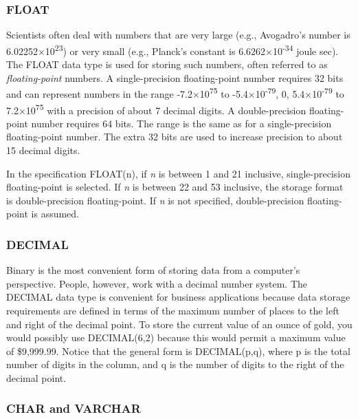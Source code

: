 \documentclass[
]{article}
\begin{document}
\hypertarget{float}{%
\subsubsection*{FLOAT}\label{float}}

Scientists often deal with numbers that are very large (e.g., Avogadro's
number is 6.02252×10\textsuperscript{23}) or very small (e.g., Planck's
constant is 6.6262×10\textsuperscript{-34} joule sec). The FLOAT data
type is used for storing such numbers, often referred to as
\emph{floating-point} numbers. A single-precision floating-point number
requires 32 bits and can represent numbers in the range
-7.2×10\textsuperscript{75} to -5.4×10\textsuperscript{-79}, 0,
5.4×10\textsuperscript{-79} to 7.2×10\textsuperscript{75} with a
precision of about 7 decimal digits. A double-precision floating-point
number requires 64 bits. The range is the same as for a single-precision
floating-point number. The extra 32 bits are used to increase precision
to about 15 decimal digits.

In the specification FLOAT(n), if \emph{n} is between 1 and 21
inclusive, single-precision floating-point is selected. If \emph{n} is
between 22 and 53 inclusive, the storage format is double-precision
floating-point. If \emph{n} is not specified, double-precision
floating-point is assumed.

\hypertarget{decimal}{%
\subsubsection*{DECIMAL}\label{decimal}}

Binary is the most convenient form of storing data from a computer's
perspective. People, however, work with a decimal number system. The
DECIMAL data type is convenient for business applications because data
storage requirements are defined in terms of the maximum number of
places to the left and right of the decimal point. To store the current
value of an ounce of gold, you would possibly use DECIMAL(6,2) because
this would permit a maximum value of \$9,999.99. Notice that the general
form is DECIMAL(p,q), where p is the total number of digits in the
column, and q is the number of digits to the right of the decimal point.

\hypertarget{char-and-varchar}{%
\subsubsection*{CHAR and VARCHAR}\label{char-and-varchar}}
\end{document}
